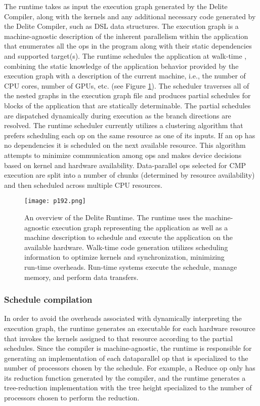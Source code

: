 The runtime takes as input the execution graph generated by
the Delite Compiler, along with the kernels and any additional
necessary code generated by the Delite Compiler, such as DSL
data structures. The execution graph is a machine-agnostic
description of the inherent parallelism within the application that enumerates all the ops in the program along with
their static dependencies and supported target(s). The runtime
schedules the application at walk-time \cite{fisher1997walk}, combining the
static knowledge of the application behavior provided by the
execution graph with a description of the current machine,
i.e., the number of CPU cores, number of GPUs, etc. (see
Figure \ref{fig:p192}). The scheduler traverses all of the nested graphs
in the execution graph file and produces partial schedules for
blocks of the application that are statically determinable. The
partial schedules are dispatched dynamically during execution
as the branch directions are resolved. The runtime scheduler
currently utilizes a clustering algorithm that prefers scheduling
each op on the same resource as one of its inputs. If an
op has no dependencies it is scheduled on the next available
resource. This algorithm attempts to minimize communication
among ops and makes device decisions based on kernel and
hardware availability. Data-parallel ops selected for CMP
execution are split into a number of chunks (determined by
resource availability) and then scheduled across multiple CPU
resources.


\begin{figure}[H]
	\centering
	\texttt{[image: p192.png]}
	\caption{An overview of the Delite Runtime. The runtime
    uses the machine-agnostic execution graph representing the
    application as well as a machine description to schedule and
    execute the application on the available hardware. Walk-time
    code generation utilizes scheduling information to optimize
    kernels and synchronization, minimizing run-time overheads.
    Run-time systems execute the schedule, manage memory, and
    perform data transfers.}
	\label{fig:p192}
\end{figure}

\subsubsection{Schedule compilation}


In order to avoid the overheads associated with dynamically interpreting the execution graph, the runtime generates
an executable for each hardware resource that invokes the
kernels assigned to that resource according to the partial
schedules. Since the compiler is machine-agnostic, the runtime
is responsible for generating an implementation of each dataparallel op that is specialized to the number of processors
chosen by the schedule. For example, a Reduce op only has its
reduction function generated by the compiler, and the runtime
generates a tree-reduction implementation with the tree height
specialized to the number of processors chosen to perform the
reduction.


